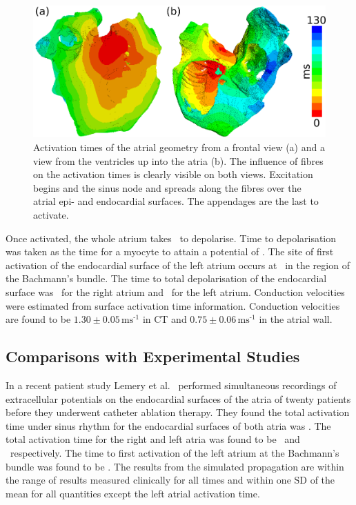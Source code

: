 \begin{figure}
\includegraphics{figures/atrium/validation/activation_times}
\caption[Activation Times Under Sinus Rhythm]{
\label{fig:atrium:validation:times}
Activation times of the atrial geometry from a frontal view (a) and a
view from the ventricles up into the atria (b).
The influence of fibres on the activation times is clearly visible on both
views.
Excitation begins and the sinus node and spreads along the fibres over the
atrial epi- and endocardial surfaces.
The appendages are the last to activate.
}
\end{figure}

Once activated, the whole atrium takes \ to depolarise.
Time to depolarisation was taken as the time for a myocyte to attain a potential
of .
The site of first activation of the endocardial surface of the left atrium
occurs at \ in the region of the Bachmann's bundle.
The time to total depolarisation of the endocardial surface was \ for
the right atrium and \ for the left atrium.
Conduction velocities were estimated from surface activation time information.
Conduction velocities are found to be $\text{1.30}\pm
0.05\,\text{ms}^{\text{-1}}$ in CT and $\text{0.75}\pm
0.06\,\text{ms}^{\text{-1}}$
in the atrial wall.


\subsection{Comparisons with Experimental Studies}

In a recent patient study Lemery et al.~\cite{Lemery2004} performed simultaneous recordings of
extracellular potentials on the endocardial surfaces of the atria of twenty
patients before they underwent catheter ablation therapy.
They found the total activation time under sinus rhythm for the endocardial
surfaces of both atria was .
The total activation time for the right and left atria was found to be \
and \ respectively.
The time to first activation of the left atrium at the Bachmann's bundle was
found to be \ms{41}.
The results from the simulated propagation are within the range of results
measured clinically for all times and within one SD of the mean for all
quantities except the left atrial activation time.

